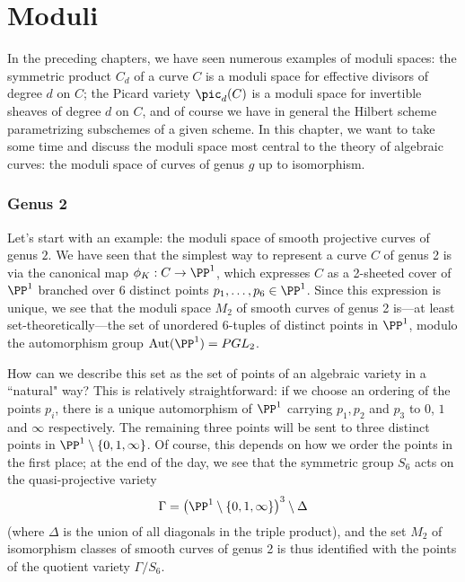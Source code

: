 

\chapter{Moduli} 
\label{Moduli chapter}\label{ModuliChapter}

In the preceding chapters, we have seen numerous examples of moduli spaces: the symmetric product $C_d$ of a curve $C$ is a moduli space for effective divisors of degree $d$ on $C$; the Picard variety $\pic_d(C)$ is a moduli space for invertible sheaves of degree $d$ on $C$, and of course we have in general the Hilbert scheme parametrizing subschemes of a given scheme. In this chapter, we want to take some time and discuss the moduli space most central to the theory of algebraic curves: the moduli space of curves of genus $g$ up to isomorphism.

\subsection{Genus 2}

Let's start with an example: the moduli space of smooth projective curves of genus $2$. We have seen that the simplest way to represent a curve $C$ of genus 2 is via the canonical map $\phi_K : C \to \PP^1$, which expresses $C$ as a 2-sheeted cover of $\PP^1$ branched over 6 distinct points $p_1,\dots,p_6 \in \PP^1$. Since this expression is unique, we see that the moduli space $M_2$ of smooth curves of genus 2 is---at least set-theoretically---the set of unordered 6-tuples of distinct points in $\PP^1$, modulo the automorphism group ${\rm Aut}(\PP^1) = PGL_2$.

How can we describe this set as the set of points of an algebraic variety in a ``natural" way? This is relatively straightforward: if we choose an ordering of the points $p_i$, there is a unique automorphism of $\PP^1$ carrying $p_1, p_2$ and $p_3$ to $0$, $1$ and $\infty$ respectively.  The remaining three points will be sent to three distinct points in $\PP^1 \setminus \{0, 1, \infty \} $. Of course, this depends on how we order the points in the first place; at the end of the day, we see that the symmetric group $S_6$ acts on the quasi-projective variety
$$
\Gamma = \left( \PP^1 \setminus \{0, 1, \infty \} \right)^3 \setminus \Delta
$$
(where $\Delta$ is the union of all diagonals in the triple product), and the set $M_2$ of isomorphism classes of smooth curves of genus 2 is thus identified with the points of the quotient variety $\Gamma/S_6$.

